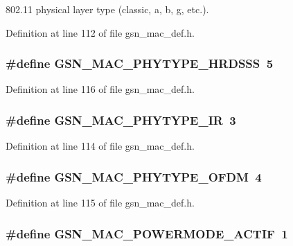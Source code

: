 802.11 physical layer type (classic, a, b, g, etc.). 



Definition at line 112 of file gsn\_\-mac\_\-def.h.

\hypertarget{a00642_ga86c7ded9f98a88e0d0b6e1f8c3c710a9}{
\subsubsection[{GSN\_\-MAC\_\-PHYTYPE\_\-HRDSSS}]{\setlength{\rightskip}{0pt plus 5cm}\#define GSN\_\-MAC\_\-PHYTYPE\_\-HRDSSS~5}}
\label{a00642_ga86c7ded9f98a88e0d0b6e1f8c3c710a9}


Definition at line 116 of file gsn\_\-mac\_\-def.h.

\hypertarget{a00642_ga0c7253eeef7a0f2a018c4b1436bc584d}{
\subsubsection[{GSN\_\-MAC\_\-PHYTYPE\_\-IR}]{\setlength{\rightskip}{0pt plus 5cm}\#define GSN\_\-MAC\_\-PHYTYPE\_\-IR~3}}
\label{a00642_ga0c7253eeef7a0f2a018c4b1436bc584d}


Definition at line 114 of file gsn\_\-mac\_\-def.h.

\hypertarget{a00642_ga23cddc9f0e4001a0b73f391e92df0302}{
\subsubsection[{GSN\_\-MAC\_\-PHYTYPE\_\-OFDM}]{\setlength{\rightskip}{0pt plus 5cm}\#define GSN\_\-MAC\_\-PHYTYPE\_\-OFDM~4}}
\label{a00642_ga23cddc9f0e4001a0b73f391e92df0302}


Definition at line 115 of file gsn\_\-mac\_\-def.h.

\hypertarget{a00642_gac05267227cbd1ea16b61aa98de2050cc}{
\subsubsection[{GSN\_\-MAC\_\-POWERMODE\_\-ACTIF}]{\setlength{\rightskip}{0pt plus 5cm}\#define GSN\_\-MAC\_\-POWERMODE\_\-ACTIF~1}}
\label{a00642_gac05267227cbd1ea16b61aa98de2050cc}


